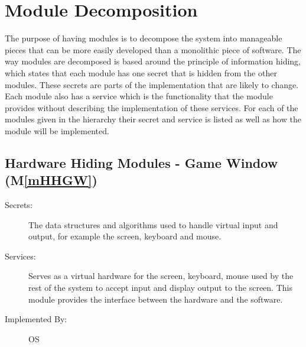 \documentclass[12pt, titlepage]{article}
\newcommand{\mref}[1]{M\ref{#1}}
\begin{document}
\section{Module Decomposition} \label{SecMD} %

The purpose of having modules is to decompose the system into manageable pieces that can be more easily developed than a monolithic piece of software. The way modules are decomposed is based around the principle of information hiding, which states that each module has one secret that is hidden from the other modules. These secrets are parts of the implementation that are likely to change. Each module also has a service which is the functionality that the module provides without describing the implementation of these services. For each of the modules given in the hierarchy their secret and service is listed as well as how the module will be implemented.



\subsection{Hardware Hiding Modules - Game Window (\mref{mHHGW})} 
\begin{description}
\item[Secrets:]The data structures and algorithms used to handle virtual input and output, for example the screen, keyboard and mouse.
\item[Services:]Serves as a virtual hardware for the screen, keyboard, mouse used by the rest of the system to accept input and display output to the screen. This module provides the interface between the hardware and the
software.
\item[Implemented By:] OS
\end{description}
\end{document}
